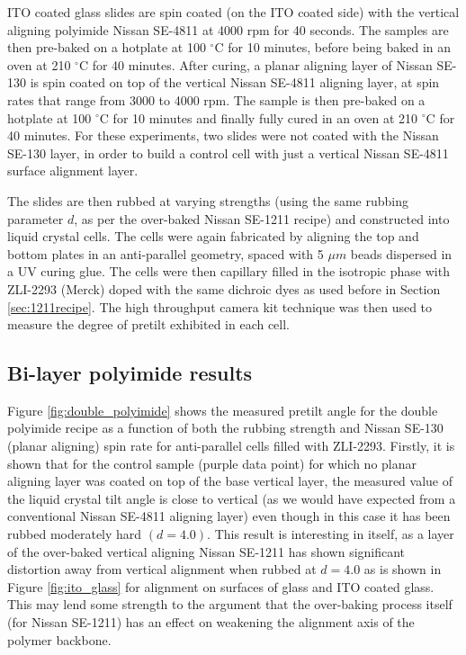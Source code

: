 ITO coated glass slides are spin coated (on the ITO coated side) with the vertical aligning polyimide Nissan SE-4811 at 4000 rpm for 40 seconds. The samples are then pre-baked on a hotplate at 100 $^{\circ}$C for 10 minutes, before being baked in an oven at 210 $^{\circ}$C for 40 minutes. After curing, a planar aligning layer of Nissan SE-130 is spin coated on top of the vertical Nissan SE-4811 aligning layer, at spin rates that range from 3000 to 4000 rpm. The sample is then pre-baked on a hotplate at 100 $^{\circ}$C for 10 minutes and finally fully cured in an oven at 210  $^{\circ}$C for 40 minutes. For these experiments, two slides were not coated with the Nissan SE-130 layer, in order to build a control cell with just a vertical Nissan SE-4811 surface alignment layer.

The slides are then rubbed at varying strengths (using the same rubbing parameter $d$, as per the over-baked Nissan SE-1211 recipe) and constructed into liquid crystal cells. The cells were again fabricated by aligning the top and bottom plates in an anti-parallel geometry, spaced with 5 $\mu m$ beads dispersed in a UV curing glue. The cells were then capillary filled in the isotropic phase with ZLI-2293 (Merck) doped with the same dichroic dyes as used before in Section \ref{sec:1211recipe}. The high throughput camera kit technique was then used to measure the degree of pretilt exhibited in each cell.

\subsection{Bi-layer polyimide results}
Figure \ref{fig:double_polyimide} shows the measured pretilt angle for the double polyimide recipe as a function of both the rubbing strength and Nissan SE-130 (planar aligning) spin rate for anti-parallel cells filled with ZLI-2293. Firstly, it is shown that for the control sample (purple data point) for which no planar aligning layer was coated on top of the base vertical layer, the measured value of the liquid crystal tilt angle is close to vertical (as we would have expected from a conventional Nissan SE-4811 aligning layer) even though in this case it has been rubbed moderately hard $\left(d=4.0\right)$. This result is interesting in itself, as a layer of the over-baked vertical aligning Nissan SE-1211 has shown significant distortion away from vertical alignment when rubbed at $d=4.0$ as is shown in Figure \ref{fig:ito_glass} for alignment on surfaces of glass and ITO coated glass. This may lend some strength to the argument that the over-baking process itself (for Nissan SE-1211) has an effect on weakening the alignment axis of the polymer backbone. 

